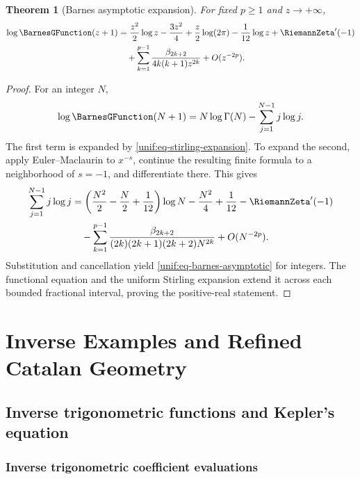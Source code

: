 \documentclass[11pt,a4paper,oneside,openany]{book}
\newtheorem{theorem}{Theorem}[chapter]
\theoremstyle{definition}
\theoremstyle{remark}
\begin{document}
\begin{theorem}[Barnes asymptotic expansion]
\label{unif:thm-barnes-asymptotic}
For fixed $p\ge1$ and $z\to+\infty$,
\begin{align}
 \log \BarnesGFunction(z+1)
 &=\frac{z^2}{2}\log z-\frac{3z^2}{4}
 +\frac z2\log(2\pi)-\frac1{12}\log z+\RiemannZeta'(-1)
 \notag\\
 &\quad+\sum_{k=1}^{p-1}
 \frac{\beta_{2k+2}}{4k(k+1)z^{2k}}+O(z^{-2p}).
 \label{unif:eq-barnes-asymptotic}
\end{align}
\end{theorem}
\begin{proof}
For an integer $N$,
\[
 \log \BarnesGFunction(N+1)=N\log\Gamma(N)-\sum_{j=1}^{N-1}j\log j.
\]
The first term is expanded by \eqref{unif:eq-stirling-expansion}. To expand
the second, apply Euler--Maclaurin to $x^{-s}$, continue the resulting finite
formula to a neighborhood of $s=-1$, and differentiate there. This gives
\begin{align*}
 \sum_{j=1}^{N-1}j\log j
 &=\left(\frac{N^2}{2}-\frac N2+\frac1{12}\right)\log N
 -\frac{N^2}{4}+\frac1{12}-\RiemannZeta'(-1)\\
 &\quad-\sum_{k=1}^{p-1}
 \frac{\beta_{2k+2}}{(2k)(2k+1)(2k+2)N^{2k}}
 +O(N^{-2p}).
\end{align*}
Substitution and cancellation yield
\eqref{unif:eq-barnes-asymptotic} for integers. The functional equation and
the uniform Stirling expansion extend it across each bounded fractional
interval, proving the positive-real statement.
\end{proof}

\part{Inverse Examples and Refined Catalan Geometry}

\chapter{Inverse trigonometric functions and Kepler's equation}

\section{Inverse trigonometric coefficient evaluations}
\end{document}
